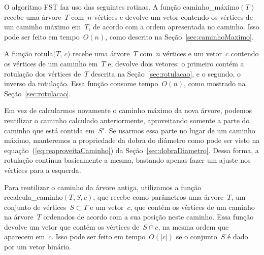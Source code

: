 		O algoritmo FST faz uso das seguintes rotinas.
		A função {\sc caminho\_máximo}$(T)$ 
		recebe uma árvore~$T$ com~$n$ vértices e
		devolve um vetor contendo os vértices de um caminho 
		máximo em~$T$, de acordo com a ordem apresentada no caminho.
		Isso pode ser feito em tempo~$O(n)$, como descrito na 
		Seção~\ref{sec:caminhoMaximo}.

		A função {\sc rotula}$(T$, $c)$ recebe uma árvore~$T$ com~$n$ vértices 
		e um vetor~$c$
		contendo os vértices de um caminho em~$T$ e,
		devolve dois vetores: o primeiro contém a rotulação dos vértices 
		de~$T$
		descrita na Seção~\ref{sec:rotulacao}, e o segundo, o inverso
		da rotulação. 
		Essa função consome tempo~$O(n)$, como mostrado na 
		Seção~\ref{sec:rotulacao}.

		Em vez de calcularmos novamente o caminho máximo da nova
		árvore, podemos reutilizar o caminho calculado anteriormente,
		aproveitando somente a parte do caminho que está contida 
		em~$S'$. 
		Se usarmos essa parte no lugar de um caminho máximo,
		manteremos a propriedade da dobra do diâmetro como pode
		ser visto na equação~(\ref{eq:reaproveitaCaminho}) da 
		Seção~\ref{sec:dobraDiametro}. 
		Dessa forma, a rotulação continua basicamente a mesma,
		bastando apenas fazer um ajuste nos vértices para a esquerda.
		
		Para reutilizar o caminho da árvore antiga, utilizamos a 
		função {\sc recalcula\_caminho}$(T,S,c)$, que
		recebe como parâmetros uma árvore~$T$, um conjunto de vértices~$S\subset T$ 
		e um vetor~$c$, que contém os vértices de um caminho na árvore~$T$ ordenados
		de acordo com a sua posição neste caminho.
		Essa função devolve um vetor que contém os vértices de~$S\cap c$, na mesma 
		ordem que aparecem em~$c$. 
		Isso pode ser feito em tempo~$O(|c|)$ se 
		o conjunto~$S$ é dado por um vetor binário.



